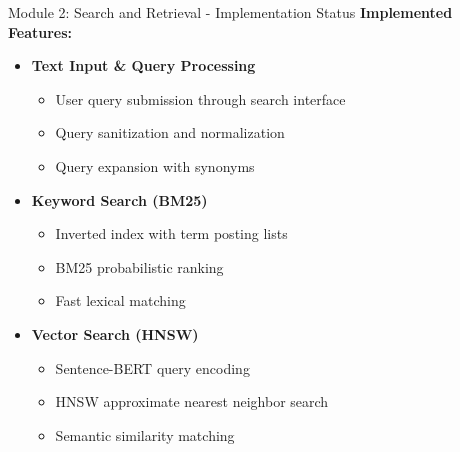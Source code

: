 \documentclass[aspectratio=169,xcolor=dvipsnames]{beamer}
\begin{document}
\begin{frame}{Module 2: Search and Retrieval - Implementation Status}
    \large
    \textbf{Implemented Features:}
    \begin{itemize}
        \item \checkmark \textbf{Text Input \& Query Processing}
        \begin{itemize}
            \normalsize
            \item User query submission through search interface
            \item Query sanitization and normalization
            \item Query expansion with synonyms
        \end{itemize}
        
        \vspace{0.5em}
        \item \checkmark \textbf{Keyword Search (BM25)}
        \begin{itemize}
            \normalsize
            \item Inverted index with term posting lists
            \item BM25 probabilistic ranking
            \item Fast lexical matching
        \end{itemize}
        
        \vspace{0.5em}
        \item \checkmark \textbf{Vector Search (HNSW)}
        \begin{itemize}
            \normalsize
            \item Sentence-BERT query encoding
            \item HNSW approximate nearest neighbor search
            \item Semantic similarity matching
        \end{itemize}
    \end{itemize}
\end{frame}
\end{document}
